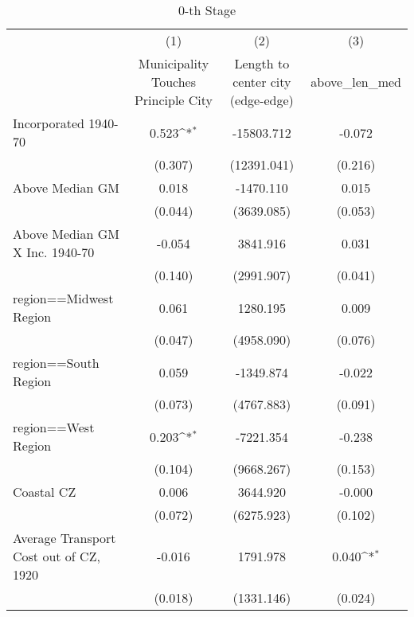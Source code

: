 \begin{table}[htbp]\centering
\def\sym#1{\ifmmode^{#1}\else\(^{#1}\)\fi}
\caption{0-th Stage}
\begin{tabular}{l*{3}{c}}
\hline\hline
                    &\multicolumn{1}{c}{(1)}&\multicolumn{1}{c}{(2)}&\multicolumn{1}{c}{(3)}\\
                    &\multicolumn{1}{c}{Municipality Touches Principle City}&\multicolumn{1}{c}{Length to center city (edge-edge)}&\multicolumn{1}{c}{above\_len\_med}\\
\hline
Incorporated 1940-70&       0.523\sym{*}  &  -15803.712         &      -0.072         \\
                    &     (0.307)         & (12391.041)         &     (0.216)         \\
[1em]
Above Median GM     &       0.018         &   -1470.110         &       0.015         \\
                    &     (0.044)         &  (3639.085)         &     (0.053)         \\
[1em]
Above Median GM X Inc. 1940-70&      -0.054         &    3841.916         &       0.031         \\
                    &     (0.140)         &  (2991.907)         &     (0.041)         \\
[1em]
region==Midwest Region&       0.061         &    1280.195         &       0.009         \\
                    &     (0.047)         &  (4958.090)         &     (0.076)         \\
[1em]
region==South Region&       0.059         &   -1349.874         &      -0.022         \\
                    &     (0.073)         &  (4767.883)         &     (0.091)         \\
[1em]
region==West Region &       0.203\sym{*}  &   -7221.354         &      -0.238         \\
                    &     (0.104)         &  (9668.267)         &     (0.153)         \\
[1em]
Coastal CZ          &       0.006         &    3644.920         &      -0.000         \\
                    &     (0.072)         &  (6275.923)         &     (0.102)         \\
[1em]
Average Transport Cost out of CZ, 1920&      -0.016         &    1791.978         &       0.040\sym{*}  \\
                    &     (0.018)         &  (1331.146)         &     (0.024)         \\

\end{tabular}
\end{table}
